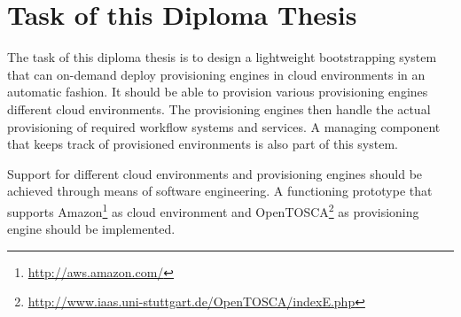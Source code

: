 \section{Task of this Diploma Thesis}

The task of this diploma thesis is to design a lightweight bootstrapping system that can on-demand deploy provisioning engines in cloud environments in an automatic fashion.
It should be able to provision various provisioning engines different cloud environments.
The provisioning engines then handle the actual provisioning of required workflow systems and services.
A managing component that keeps track of provisioned environments is also part of this system.

Support for different cloud environments and provisioning engines should be achieved through means of software engineering.
A functioning prototype that supports Amazon\footnote{\url{http://aws.amazon.com/}} as cloud environment and OpenTOSCA\footnote{\url{http://www.iaas.uni-stuttgart.de/OpenTOSCA/indexE.php}} as provisioning engine should be implemented.
